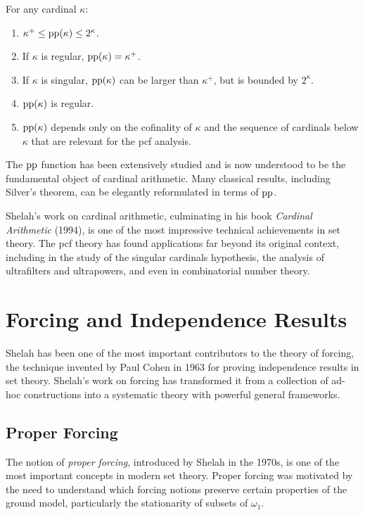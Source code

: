 \begin{theorem}
For any cardinal \(\kappa\):
\begin{enumerate}
    \item \(\kappa^{+} \leq \operatorname{pp}(\kappa) \leq 2^{\kappa}\).
    \item If \(\kappa\) is regular, \(\operatorname{pp}(\kappa) = \kappa^{+}\).
    \item If \(\kappa\) is singular, \(\operatorname{pp}(\kappa)\) can be larger than \(\kappa^{+}\), but is bounded by \(2^{\kappa}\).
    \item \(\operatorname{pp}(\kappa)\) is regular.
    \item \(\operatorname{pp}(\kappa)\) depends only on the cofinality of \(\kappa\) and the sequence of cardinals below \(\kappa\) that are relevant for the pcf analysis.
\end{enumerate}
\end{theorem}

The \(\operatorname{pp}\) function has been extensively studied and is now understood to be the fundamental object of cardinal arithmetic. Many classical results, including Silver's theorem, can be elegantly reformulated in terms of \(\operatorname{pp}\).

Shelah's work on cardinal arithmetic, culminating in his book \textit{Cardinal Arithmetic} (1994), is one of the most impressive technical achievements in set theory. The pcf theory has found applications far beyond its original context, including in the study of the singular cardinals hypothesis, the analysis of ultrafilters and ultrapowers, and even in combinatorial number theory.

\section{Forcing and Independence Results}

Shelah has been one of the most important contributors to the theory of forcing, the technique invented by Paul Cohen in 1963 for proving independence results in set theory. Shelah's work on forcing has transformed it from a collection of ad-hoc constructions into a systematic theory with powerful general frameworks.

\subsection{Proper Forcing}

The notion of \emph{proper forcing}, introduced by Shelah in the 1970s, is one of the most important concepts in modern set theory. Proper forcing was motivated by the need to understand which forcing notions preserve certain properties of the ground model, particularly the stationarity of subsets of \(\omega_1\).


